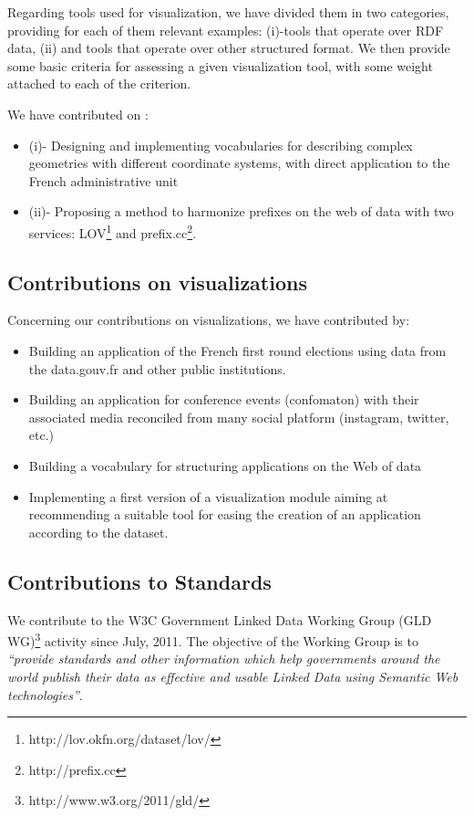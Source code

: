 Regarding tools used for visualization, we have divided them in two categories, providing for each of them relevant examples: (i)-tools that operate over RDF data, (ii) and tools that operate over other structured format. We then provide some basic criteria for assessing a given visualization tool, with some weight attached to each of the criterion. 

We have contributed  on : 
\begin{itemize}
\item (i)- Designing and implementing vocabularies for describing complex geometries with different coordinate systems, with direct application to the French administrative unit
\item (ii)- Proposing a method to harmonize prefixes on the web of data  with two services: LOV\footnote{http://lov.okfn.org/dataset/lov/} and prefix.cc\footnote{http://prefix.cc}. 
\end{itemize}

\subsection{Contributions on visualizations}
Concerning our contributions on visualizations, we have contributed by:
\begin{itemize}
\item Building an application of the French first round elections using data from the data.gouv.fr and other public institutions.
\item Building an application for conference events (confomaton) with their associated media reconciled from many social platform (instagram, twitter, etc.)
\item Building a vocabulary for structuring applications on the Web of data
\item Implementing a first version of a visualization module aiming at recommending a suitable tool for easing the creation of an application according to the dataset.

\end{itemize}

\subsection{Contributions to Standards}
We contribute to the W3C Government Linked Data Working Group (GLD WG)\footnote{http://www.w3.org/2011/gld/} activity since July, 2011.  The objective of the Working Group is to \textit{``provide standards and other information which help governments around the world publish their data as effective and usable Linked Data using Semantic Web technologies''}. %

